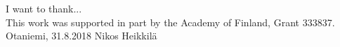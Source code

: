 I want to thank...\\
This work was supported in part by the Academy of Finland, Grant 333837.
\vspace{5cm}
Otaniemi, 31.8.2018
\vspace{5mm}
{\hfill Nikos Heikkilä \hspace{1cm}}
